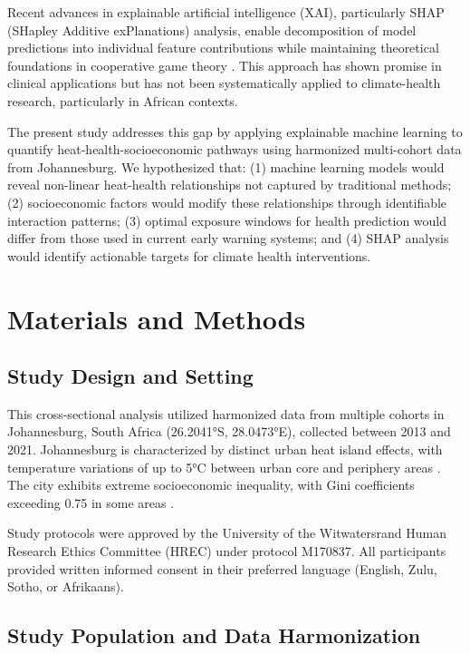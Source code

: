 \documentclass[journal,article,submit,pdftex,moreauthors]{Definitions/mdpi}
\begin{document}
Recent advances in explainable artificial intelligence (XAI), particularly SHAP (SHapley Additive exPlanations) analysis, enable decomposition of model predictions into individual feature contributions while maintaining theoretical foundations in cooperative game theory \cite{lundberg2017unified}. This approach has shown promise in clinical applications \cite{chen2020machine} but has not been systematically applied to climate-health research, particularly in African contexts.

The present study addresses this gap by applying explainable machine learning to quantify heat-health-socioeconomic pathways using harmonized multi-cohort data from Johannesburg. We hypothesized that: (1) machine learning models would reveal non-linear heat-health relationships not captured by traditional methods; (2) socioeconomic factors would modify these relationships through identifiable interaction patterns; (3) optimal exposure windows for health prediction would differ from those used in current early warning systems; and (4) SHAP analysis would identify actionable targets for climate health interventions.

\section{Materials and Methods}

\subsection{Study Design and Setting}

This cross-sectional analysis utilized harmonized data from multiple cohorts in Johannesburg, South Africa (26.2041°S, 28.0473°E), collected between 2013 and 2021. Johannesburg is characterized by distinct urban heat island effects, with temperature variations of up to 5°C between urban core and periphery areas \cite{jury2021johannesburg}. The city exhibits extreme socioeconomic inequality, with Gini coefficients exceeding 0.75 in some areas \cite{gcro2016quality}.

Study protocols were approved by the University of the Witwatersrand Human Research Ethics Committee (HREC) under protocol M170837. All participants provided written informed consent in their preferred language (English, Zulu, Sotho, or Afrikaans).

\subsection{Study Population and Data Harmonization}
\end{document}
